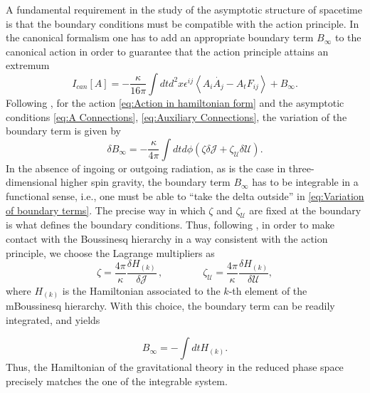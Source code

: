 \documentclass[letterpaper,11pt,oneside]{book}
\begin{document}
A fundamental requirement in the study of the asymptotic structure
of spacetime is that the boundary conditions must be compatible with
the action principle. In the canonical formalism one has to add an
appropriate boundary term $B_{\infty}$ to the canonical action in
order to guarantee that the action principle attains an extremum \cite{Regge:1974zd}
\begin{equation}
	I_{can}\left[A\right]=-\frac{\kappa}{16\pi}\int dtd^{2}x\epsilon^{ij}\left\langle A_{i}\dot{A_{j}}-A_{t}F_{ij}\right\rangle +B_{\infty}.\label{eq:Action in hamiltonian form}
\end{equation}
Following \cite{Grumiller:2016kcp}, for the action \eqref{eq:Action in hamiltonian form}
and the asymptotic conditions \eqref{eq:A Connections}, \eqref{eq:Auxiliary Connections},
the variation of the boundary term is given by
\begin{equation}
	\delta B_{\infty}=-\frac{\kappa}{4\pi}\int dtd\phi\left(\zeta\delta\mathcal{J}+\zeta_{\mathcal{U}}\delta\mathcal{U}\right).\label{eq:Variation of boundary terms}
\end{equation}
In the absence of ingoing or outgoing radiation, as is the case in
three-dimensional higher spin gravity, the boundary term $B_{\infty}$
has to be integrable in a functional sense, i.e., one must be able
to ``take the delta outside'' in \eqref{eq:Variation of boundary terms}.
The precise way in which $\zeta$ and $\zeta_{\mathcal{U}}$ are fixed
at the boundary is what defines the boundary conditions. Thus, following
\cite{Perez:2016vqo}, in order to make contact with the Boussinesq
hierarchy in a way consistent with the action principle, we choose
the Lagrange multipliers as
\begin{equation}
	\zeta=\frac{4\pi}{\kappa}\frac{\delta H_{\left(k\right)}}{\delta\mathcal{J}}\,,\qquad\qquad\zeta_{\mathcal{U}}=\frac{4\pi}{\kappa}\frac{\delta H_{\left(k\right)}}{\delta\mathcal{U}},\label{eq:chemical potentials}
\end{equation}
where $H_{\left(k\right)}$ is the Hamiltonian associated to the $k$-th
element of the mBoussinesq hierarchy. With this choice, the boundary
term can be readily integrated, and yields

\begin{equation}
	B_{\infty}=-\int dtH_{\left(k\right)}.\label{eq:Boundary terms in terms of H}
\end{equation}
Thus, the Hamiltonian of the gravitational theory in the reduced phase
space precisely matches the one of the integrable system.
\end{document}
